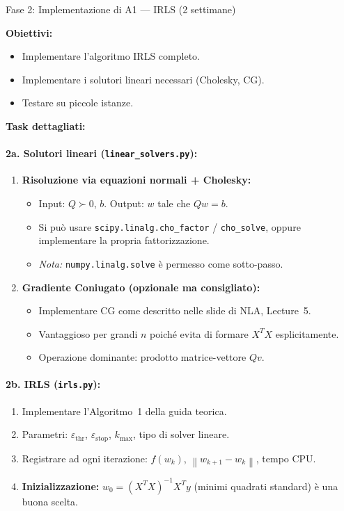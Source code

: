 \documentclass[a4paper,11pt]{article}
\newcommand{\norm}[1]{\left\lVert #1 \right\rVert}
\begin{document}
\begin{phasebox}{Fase 2: Implementazione di A1 --- IRLS (2 settimane)}

\textbf{Obiettivi:}
\begin{itemize}[nosep]
  \item Implementare l'algoritmo IRLS completo.
  \item Implementare i solutori lineari necessari (Cholesky, CG).
  \item Testare su piccole istanze.
\end{itemize}

\textbf{Task dettagliati:}

\paragraph{2a. Solutori lineari (\texttt{linear\_solvers.py}):}
\begin{enumerate}[nosep]
  \item \textbf{Risoluzione via equazioni normali + Cholesky:}
  \begin{itemize}[nosep]
    \item Input: $Q \succ 0$, $b$. Output: $w$ tale che $Qw = b$.
    \item Si può usare \texttt{scipy.linalg.cho\_factor} / \texttt{cho\_solve}, oppure implementare la propria fattorizzazione.
    \item \emph{Nota:} \texttt{numpy.linalg.solve} è permesso come sotto-passo.
  \end{itemize}
  \item \textbf{Gradiente Coniugato (opzionale ma consigliato):}
  \begin{itemize}[nosep]
    \item Implementare CG come descritto nelle slide di NLA, Lecture~5.
    \item Vantaggioso per grandi $n$ poiché evita di formare $X^TX$ esplicitamente.
    \item Operazione dominante: prodotto matrice-vettore $Q v$.
  \end{itemize}
\end{enumerate}

\paragraph{2b. IRLS (\texttt{irls.py}):}
\begin{enumerate}[nosep]
  \item Implementare l'Algoritmo~1 della guida teorica.
  \item Parametri: $\varepsilon_{\text{thr}}$, $\varepsilon_{\text{stop}}$, $k_{\max}$, tipo di solver lineare.
  \item Registrare ad ogni iterazione: $f(w_k)$, $\norm{w_{k+1}-w_k}$, tempo CPU.
  \item \textbf{Inizializzazione:} $w_0 = (X^TX)^{-1}X^Ty$ (minimi quadrati standard) è una buona scelta.
\end{enumerate}


\end{phasebox}
\end{document}
